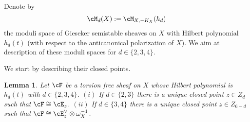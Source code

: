 \documentclass[11pt]{amsart}
\theoremstyle{plain}
\newtheorem{lemma}[theorem]{Lemma}
\theoremstyle{definition}
\theoremstyle{remark}
\begin{document}
Denote by 
\begin{equation}
\label{eq:mdx}
\cM_d(X) := \cM_{X,-K_X}(h_d)
\end{equation}
the moduli space of Gieseker semistable sheaves on $X$ with Hilbert polynomial $h_d(t)$ (with respect to the anticanonical polarization of $X$).
We aim at description of these moduli spaces for $d  \in \{2,3,4\}$.


We start by describing their closed points.

\begin{lemma}
\label{lemma:md-points}
Let $\cF$ be a torsion free sheaf on $X$ whose Hilbert polynomial is $h_d(t)$ with $d \in \{2, 3, 4 \}$.
$(i)$ If $d \in \{2, 3\}$ there is a unique closed point $z \in Z_d$ such that $\cF \cong \cE_z$.
\newline
$(ii)$ If $d \in \{3, 4\}$ there is a unique closed point $z \in Z_{6-d}$ such that $\cF \cong \cE_z^\vee \otimes \omega_X^{-1}$.
\end{lemma}
\end{document}
